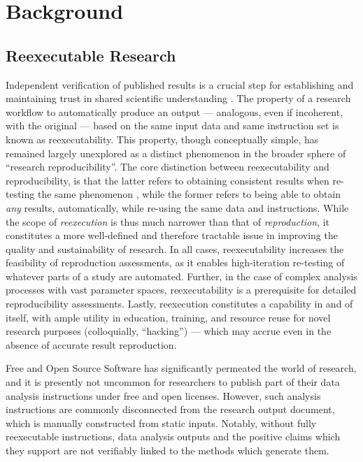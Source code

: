 \section{Background}

\subsection{Reexecutable Research}

Independent verification of published results is a crucial step for establishing and maintaining trust in shared scientific understanding \cite{rpp, Ioannidis2005}.
The property of a research workflow to automatically produce an output — analogous, even if incoherent, with the original — based on the same input data and same instruction set is known as reexecutability.
This property, though conceptually simple, has remained largely unexplored as a distinct phenomenon in the broader sphere of “research reproducibility”.
The core distinction between reexecutability and reproducibility, is that the latter refers to obtaining consistent results when re-testing the same phenomenon \cite{NASrepro}, while the former refers to being able to obtain \textit{any} results, automatically, while re-using the same data and instructions.
While the scope of \textit{reexecution} is thus much narrower than that of \textit{reproduction}, it constitutes a more well-defined and therefore tractable issue in improving the quality and sustainability of research.
In all cases, reexecutability increases the feasibility of reproduction assessments, as it enables high-iteration re-testing of whatever parts of a study are automated.
Further, in the case of complex analysis processes with vast parameter spaces, reexecutability is a prerequisite for detailed reproducibility assessments.
Lastly, reexecution constitutes a capability in and of itself, with ample utility in education, training, and resource reuse for novel research purposes (colloquially, “hacking”) — which may accrue even in the absence of accurate result reproduction.

Free and Open Source Software \cite{foss} has significantly permeated the world of research, and it is presently not uncommon for researchers to publish part of their data analysis instructions under free and open licenses.
However, such analysis instructions are commonly disconnected from the research output document, which is manually constructed from static inputs.
Notably, without fully reexecutable instructions, data analysis outputs and the positive claims which they support are not verifiably linked to the methods which generate them.

